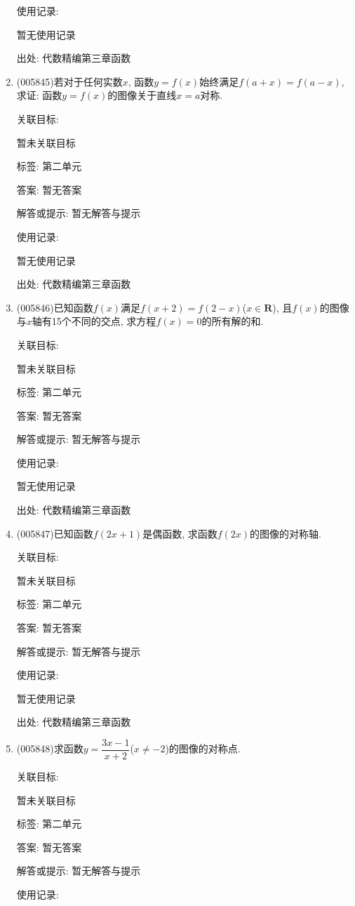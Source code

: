 \documentclass[10pt,a4paper]{article}
\begin{document}
\begin{enumerate}[1.]
使用记录:

暂无使用记录


出处: 代数精编第三章函数
\item { (005845)}若对于任何实数$x$, 函数$y=f(x)$始终满足$f(a+x)=f(a-x)$, 求证: 函数$y=f(x)$的图像关于直线$x=a$对称.


关联目标:

暂未关联目标



标签: 第二单元

答案: 暂无答案

解答或提示: 暂无解答与提示

使用记录:

暂无使用记录


出处: 代数精编第三章函数
\item { (005846)}已知函数$f(x)$满足$f(x+2)=f(2-x)$($x\in \mathbf{R}$), 且$f(x)$的图像与$x$轴有15个不同的交点, 求方程$f(x)=0$的所有解的和.


关联目标:

暂未关联目标



标签: 第二单元

答案: 暂无答案

解答或提示: 暂无解答与提示

使用记录:

暂无使用记录


出处: 代数精编第三章函数
\item { (005847)}已知函数$f(2x+1)$是偶函数, 求函数$f(2x)$的图像的对称轴.


关联目标:

暂未关联目标



标签: 第二单元

答案: 暂无答案

解答或提示: 暂无解答与提示

使用记录:

暂无使用记录


出处: 代数精编第三章函数
\item { (005848)}求函数$y=\dfrac{3x-1}{x+2}$($x\ne -2$)的图像的对称点.


关联目标:

暂未关联目标



标签: 第二单元

答案: 暂无答案

解答或提示: 暂无解答与提示

使用记录:


\end{enumerate}
\end{document}
